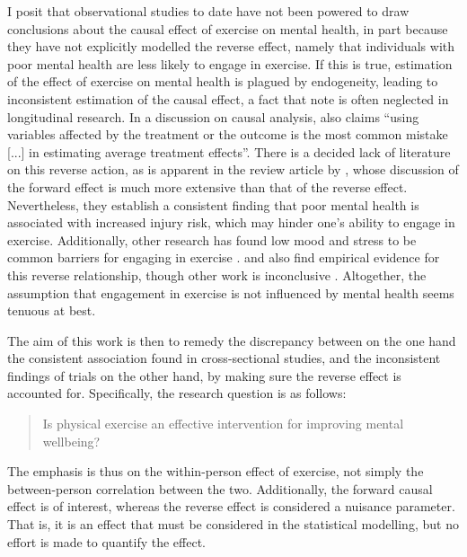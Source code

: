 I posit that observational studies to date have not been powered to draw conclusions about the causal effect
of exercise on mental health, in part because they have not explicitly modelled the reverse effect, namely that individuals with poor
mental health are less likely to engage in exercise. If this is true, estimation of the effect of exercise on mental health is
plagued by endogeneity, leading to inconsistent estimation of the causal effect, a fact that  note is often neglected in
longitudinal research. In a discussion on causal analysis,  also claims ``using variables affected by
the treatment or the outcome is the most common mistake [...] in estimating average treatment effects''.
There is a decided lack of literature on this reverse action, as is apparent in the review article by ,
whose discussion of the forward effect is much more extensive than that of the reverse effect.
Nevertheless, they establish a consistent finding that poor mental health is associated with increased injury risk,
which may hinder one's ability to engage in exercise.
Additionally, other research has found low mood and stress to be common barriers for
engaging in exercise \cite{firth2016motivating}.
 and  also find empirical evidence for this reverse relationship,
though other work is inconclusive \cite{birkeland2009longitudinal, ku2012physical}. Altogether, the assumption that engagement
in exercise is not influenced by mental health seems tenuous at best.

The aim of this work is then to remedy the discrepancy between on the one hand the consistent association found in
cross-sectional studies, and the inconsistent findings of trials on the other hand, by making sure the reverse effect
is accounted for.
Specifically, the research question is as follows:
\begin{quote}
    Is physical exercise an effective intervention for improving mental wellbeing?
\end{quote}
The emphasis is thus on the within-person effect of exercise, not simply the between-person correlation between the two.
Additionally, the forward causal effect is of interest, whereas the reverse effect is considered a nuisance parameter.
That is, it is an effect that must be considered in the statistical modelling, but no effort is made to quantify
the effect.


